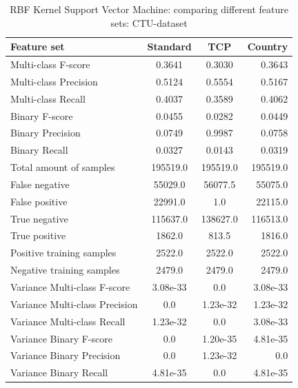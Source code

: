 \begin{table}[H]
\caption{RBF Kernel Support Vector Machine: comparing different feature sets: CTU-dataset}
\label{tab:svm:ctu}
\centering
\begin{tabular}{l c c r}
\toprule
Feature set & Standard & TCP & Country \\
\midrule
Multi-class F-score & 0.3641 & 0.3030 & 0.3643 \\
Multi-class Precision & 0.5124 & 0.5554 & 0.5167 \\
Multi-class Recall & 0.4037 & 0.3589 & 0.4062 \\
\midrule
Binary F-score & 0.0455 & 0.0282 & 0.0449 \\
Binary Precision & 0.0749 & 0.9987 & 0.0758 \\
Binary Recall & 0.0327 & 0.0143 & 0.0319 \\
\midrule
Total amount of samples & 195519.0 & 195519.0 & 195519.0 \\
False negative & 55029.0 & 56077.5 & 55075.0 \\
False positive & 22991.0 & 1.0 & 22115.0 \\
True negative & 115637.0 & 138627.0 & 116513.0 \\
True positive & 1862.0 & 813.5 & 1816.0\\
\midrule
Positive training samples & 2522.0 & 2522.0 & 2522.0\\
Negative training samples & 2479.0 & 2479.0 & 2479.0\\
\midrule
Variance Multi-class F-score & 3.08e-33 & 0.0 & 3.08e-33 \\
Variance Multi-class Precision & 0.0 & 1.23e-32 & 1.23e-32 \\
Variance Multi-class Recall & 1.23e-32 & 0.0 & 3.08e-33  \\
\midrule
Variance Binary F-score & 0.0 & 1.20e-35 & 4.81e-35 \\
Variance Binary Precision & 0.0 & 1.23e-32 & 0.0 \\
Variance Binary Recall & 4.81e-35 & 0.0 & 4.81e-35 \\
\bottomrule
\end{tabular}
\end{table}


